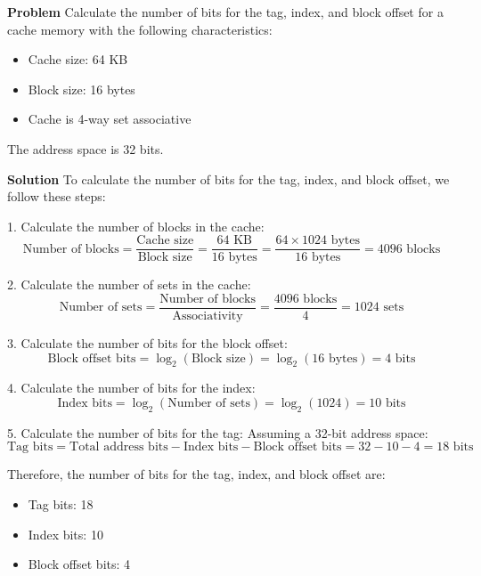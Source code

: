 \textbf{Problem}
Calculate the number of bits for the tag, index, and block offset for a cache memory with the following characteristics:
\begin{itemize}
    \item Cache size: 64 KB
    \item Block size: 16 bytes
    \item Cache is 4-way set associative
\end{itemize}
The address space is 32 bits.

\textbf{Solution}
To calculate the number of bits for the tag, index, and block offset, we follow these steps:

1. Calculate the number of blocks in the cache:
\[
\text{Number of blocks} = \frac{\text{Cache size}}{\text{Block size}} = \frac{64 \text{ KB}}{16 \text{ bytes}} = \frac{64 \times 1024 \text{ bytes}}{16 \text{ bytes}} = 4096 \text{ blocks}
\]

2. Calculate the number of sets in the cache:
\[
\text{Number of sets} = \frac{\text{Number of blocks}}{\text{Associativity}} = \frac{4096 \text{ blocks}}{4} = 1024 \text{ sets}
\]

3. Calculate the number of bits for the block offset:
\[
\text{Block offset bits} = \log_2(\text{Block size}) = \log_2(16 \text{ bytes}) = 4 \text{ bits}
\]

4. Calculate the number of bits for the index:
\[
\text{Index bits} = \log_2(\text{Number of sets}) = \log_2(1024) = 10 \text{ bits}
\]

5. Calculate the number of bits for the tag:
Assuming a 32-bit address space:
\[
\text{Tag bits} = \text{Total address bits} - \text{Index bits} - \text{Block offset bits} = 32 - 10 - 4 = 18 \text{ bits}
\]

Therefore, the number of bits for the tag, index, and block offset are:
\begin{itemize}
    \item Tag bits: 18
    \item Index bits: 10
    \item Block offset bits: 4
\end{itemize}